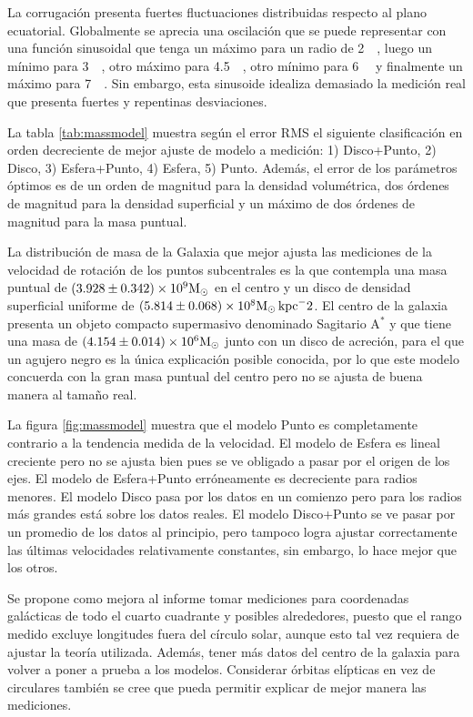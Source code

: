 La corrugación presenta fuertes fluctuaciones distribuidas respecto al plano ecuatorial. Globalmente se aprecia una oscilación que se puede representar con una función sinusoidal que tenga un máximo para un radio de \SI{2}{\kilo\parsec}, luego un mínimo para \SI{3}{\kilo\parsec}, otro máximo para \SI{4.5}{\kilo\parsec}, otro mínimo para \SI{6}{\kilo\parsec} y finalmente un máximo para \SI{7}{\kilo\parsec}. Sin embargo, esta sinusoide idealiza demasiado la medición real que presenta fuertes y repentinas desviaciones.

La tabla \ref{tab:massmodel} muestra según el error RMS el siguiente clasificación en orden decreciente de mejor ajuste de modelo a medición: 1) Disco+Punto, 2) Disco, 3) Esfera+Punto, 4) Esfera, 5) Punto. Además, el error de los parámetros óptimos es de un orden de magnitud para la densidad volumétrica, dos órdenes de magnitud para la densidad superficial y un máximo de dos órdenes de magnitud para la masa puntual.

La distribución de masa de la Galaxia que mejor ajusta las mediciones de la velocidad de rotación de los puntos subcentrales es la que contempla una masa puntual de $(3.928\pm0.342)\times10^9\textnormal{M}_\odot$ en el centro y un disco de densidad superficial uniforme de $(5.814\pm0.068)\times10^8\textnormal{M}_\odot\,\textnormal{kpc}^-2$. El centro de la galaxia presenta un objeto compacto supermasivo denominado Sagitario A$^\ast$ y que tiene una masa de $(4.154\pm0.014)\times10^6\textnormal{M}_\odot$ junto con un disco de acreción, para el que un agujero negro es la única explicación posible conocida, por lo que este modelo concuerda con la gran masa puntual del centro pero no se ajusta de buena manera al tamaño real.

La figura \ref{fig:massmodel} muestra que el modelo Punto es completamente contrario a la tendencia medida de la velocidad. El modelo de Esfera es lineal creciente pero no se ajusta bien pues se ve obligado a pasar por el origen de los ejes. El modelo de Esfera+Punto erróneamente es decreciente para radios menores. El modelo Disco pasa por los datos en un comienzo pero para los radios más grandes está sobre los datos reales. El modelo Disco+Punto se ve pasar por un promedio de los datos al principio, pero tampoco logra ajustar correctamente las últimas velocidades relativamente constantes, sin embargo, lo hace mejor que los otros.

Se propone como mejora al informe tomar mediciones para coordenadas galácticas de todo el cuarto cuadrante y posibles alrededores, puesto que el rango medido excluye longitudes fuera del círculo solar, aunque esto tal vez requiera de ajustar la teoría utilizada. Además, tener más datos del centro de la galaxia para volver a poner a prueba a los modelos. Considerar órbitas elípticas en vez de circulares también se cree que pueda permitir explicar de mejor manera las mediciones.

